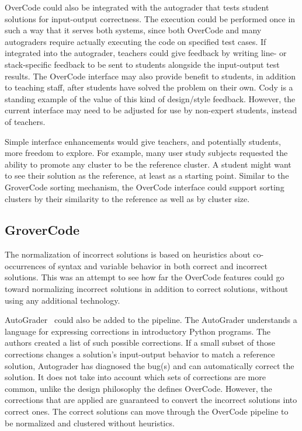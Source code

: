 \documentclass[12pt,twoside]{mitthesis}
\begin{document}
OverCode could also be integrated with the autograder that tests student solutions for input-output correctness. The execution could be performed once in such a way that it serves both systems, since both OverCode and many autograders require actually executing the code on specified test cases. If integrated into the autograder, teachers could give feedback by writing line- or stack-specific feedback to be sent to students alongside the input-output test results. The OverCode interface may also provide benefit to students, in addition to teaching staff, after students have solved the problem on their own. Cody is a standing example of the value of this kind of design/style feedback. However, the current interface may need to be adjusted for use by non-expert students, instead of teachers. %

Simple interface enhancements would give teachers, and potentially students, more freedom to explore. For example, many user study subjects requested the ability to promote any cluster to be the reference cluster. A student might want to see their solution as the reference, at least as a starting point. Similar to the GroverCode sorting mechanism, the OverCode interface could support sorting clusters by their similarity to the reference as well as by cluster size. 


\subsection{GroverCode}

The normalization of incorrect solutions is based on heuristics about co-occurrences of syntax and variable behavior in both correct and incorrect solutions. This was an attempt to see how far the OverCode features could go toward normalizing incorrect solutions in addition to correct solutions, without using any additional technology. 

AutoGrader~\cite{autograder} could also be added to the pipeline. The AutoGrader understands a language for expressing corrections in introductory Python programs. The authors created a list of such possible corrections. If a small subset of those corrections changes a solution's input-output behavior to match a reference solution, Autograder has diagnosed the bug(s) and can automatically correct the solution. It does not take into account which sets of corrections are more common, unlike the design philosophy the defines OverCode. However, the corrections that are applied are guaranteed to convert the incorrect solutions into correct ones. The correct solutions can move through the OverCode pipeline to be normalized and clustered without heuristics. 
\end{document}
